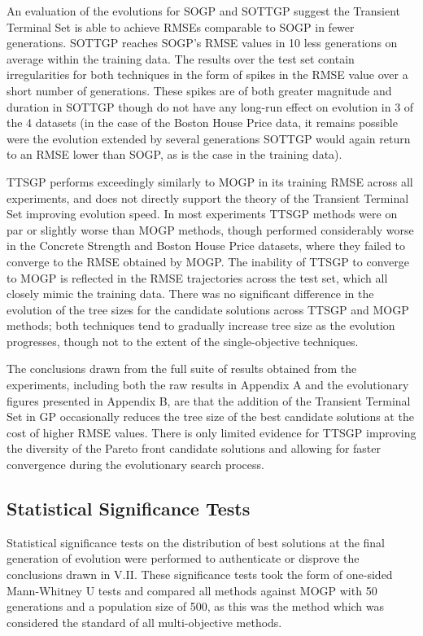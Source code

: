 \documentclass[a4paper, twocolumn]{article}
\begin{document}
An evaluation of the evolutions for SOGP and SOTTGP suggest the Transient Terminal Set is able to achieve RMSEs comparable to SOGP in fewer generations. SOTTGP reaches SOGP's RMSE values in 10 less generations on average within the training data. The results over the test set contain irregularities for both techniques in the form of spikes in the RMSE value over a short number of generations. These spikes are of both greater magnitude and duration in SOTTGP though do not have any long-run effect on evolution in 3 of the 4 datasets (in the case of the Boston House Price data, it remains possible were the evolution extended by several generations SOTTGP would again return to an RMSE lower than SOGP, as is the case in the training data).

TTSGP performs exceedingly similarly to MOGP in its training RMSE across all experiments, and does not directly support the theory of the Transient Terminal Set improving evolution speed. In most experiments TTSGP methods were on par or slightly worse than MOGP methods, though performed considerably worse in the Concrete Strength and Boston House Price datasets, where they failed to converge to the RMSE obtained by MOGP. The inability of TTSGP to converge to MOGP is reflected in the RMSE trajectories across the test set, which all closely mimic the training data. There was no significant difference in the evolution of the tree sizes for the candidate solutions across TTSGP and MOGP methods; both techniques tend to gradually increase tree size as the evolution progresses, though not to the extent of the single-objective techniques.

The conclusions drawn from the full suite of results obtained from the experiments, including both the raw results in Appendix A and the evolutionary figures presented in Appendix B, are that the addition of the Transient Terminal Set in GP occasionally reduces the tree size of the best candidate solutions at the cost of higher RMSE values. There is only limited evidence for TTSGP improving the diversity of the Pareto front candidate solutions and allowing for faster convergence during the evolutionary search process.

\subsection{Statistical Significance Tests}
Statistical significance tests on the distribution of best solutions at the final generation of evolution were performed to authenticate or disprove the conclusions drawn in V.II. These significance tests took the form of one-sided Mann-Whitney U tests and compared all methods against MOGP with 50 generations and a population size of 500, as this was the method which was considered the standard of all multi-objective methods. 
\end{document}
